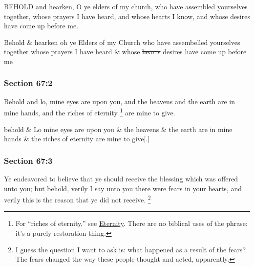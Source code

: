 		BEHOLD and hearken, O ye elders of my church, who have assembled yourselves together, whose prayers I have heard, and whose hearts I know, and whose desires have come up before me.

		\begin{framed}
		\scriptsize
			\begin{compactdesc}
				\item[JSP] Behold \& hearken oh ye Elders of my Church who have assembelled yourselves together whose prayers I have heard \& whose \sout{hearts} desires have come up before me
			\end{compactdesc}
		\end{framed}

	\subsubsection{Section 67:2} %
		\label{DC67-2}

		Behold and lo, mine eyes are upon you, and the heavens and the earth are in mine hands, and the riches of eternity%
			\footnote{%
				For ``riches of eternity,'' see \hyperref[ETERNITY-PHRASES]{Eternity}. There are no biblical uses of the phrase; it's a purely restoration thing.
				}
		are mine to give.

		\begin{framed}
		\scriptsize
			\begin{compactdesc}
				\item[JSP] behold \& Lo mine eyes are upon you \& the heavens \& the earth are in mine hands \& the riches of eternity are mine to give[.]
			\end{compactdesc}
		\end{framed}

	\subsubsection{Section 67:3} %
		\label{DC67-3}

		Ye endeavored to believe that ye should receive the blessing which was offered unto you; but behold, verily I say unto you there were fears in your hearts, and verily this is the reason that ye did not receive.%
			\footnote{%
				I guess the question I want to ask is: what happened as a result of the fears? The fears changed the way these people thought and acted, apparently.
				}

